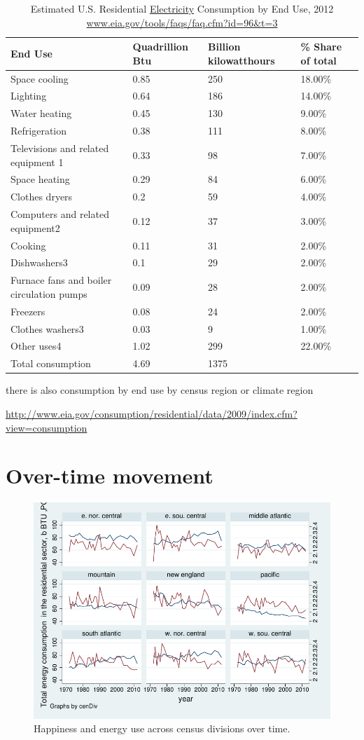 \documentclass[10pt, letterpaper]{article}
\begin{document}
\begin{spacing}{1.4}
\begin{table}[H]\centering\footnotesize
\caption{\label{eleEndUse}  Estimated U.S. Residential \underline{Electricity} Consumption by End
  Use, 2012 \url{www.eia.gov/tools/faqs/faq.cfm?id=96&t=3}}
\begin{tabular} {llll}   \hline 
End Use&Quadrillion Btu &Billion kilowatthours& \% Share of total\\\hline 
Space cooling&0.85&250&18.00\%\\
Lighting&0.64&186&14.00\%\\
Water heating&0.45&130&9.00\%\\
Refrigeration&0.38&111&8.00\%\\
Televisions and related equipment 1&0.33&98&7.00\%\\
Space heating&0.29&84&6.00\%\\
Clothes dryers&0.2&59&4.00\%\\
Computers and related equipment2&0.12&37&3.00\%\\
Cooking&0.11&31&2.00\%\\
Dishwashers3 &0.1&29&2.00\%\\
Furnace fans and boiler circulation pumps&0.09&28&2.00\%\\
Freezers&0.08&24&2.00\%\\
Clothes washers3&0.03&9&1.00\%\\
Other uses4&1.02&299&22.00\%\\
Total consumption&4.69&1375&\\\hline
\end{tabular}\end{table}

there is also consumption by end use by census region or climate region

\url{http://www.eia.gov/consumption/residential/data/2009/index.cfm?view=consumption}

\section{Over-time movement}

\begin{figure}[H]
 \includegraphics[width=6in]{graphsAndTables/cenDivLsYr.pdf}\centering
\caption{Happiness and energy use across census divisions over time.}\label{cenDivLsYr}
 \end{figure}

\end{spacing}
\end{document}
